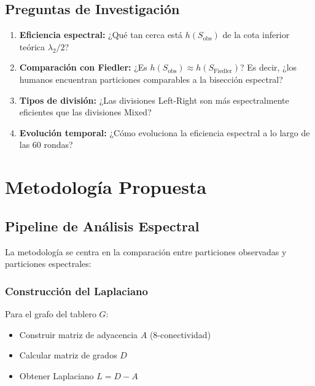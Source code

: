 \documentclass[conference]{IEEEtran}
\begin{document}
\subsection{Preguntas de Investigación}

\begin{enumerate}
    \item \textbf{Eficiencia espectral:} ¿Qué tan cerca está $h(S_{\text{obs}})$ de la cota inferior teórica $\lambda_2/2$?
    
    \item \textbf{Comparación con Fiedler:} ¿Es $h(S_{\text{obs}}) \approx h(S_{\text{Fiedler}})$? Es decir, ¿los humanos encuentran particiones comparables a la bisección espectral?
    
    \item \textbf{Tipos de división:} ¿Las divisiones Left-Right son más espectralmente eficientes que las divisiones Mixed?
    
    \item \textbf{Evolución temporal:} ¿Cómo evoluciona la eficiencia espectral a lo largo de las 60 rondas?
\end{enumerate}

\section{Metodología Propuesta}

\subsection{Pipeline de Análisis Espectral}

La metodología se centra en la comparación entre particiones observadas y particiones espectrales:

\subsubsection{Construcción del Laplaciano}

Para el grafo del tablero $G$:
\begin{itemize}
    \item Construir matriz de adyacencia $A$ (8-conectividad)
    \item Calcular matriz de grados $D$
    \item Obtener Laplaciano $L = D - A$
\end{itemize}
\end{document}
